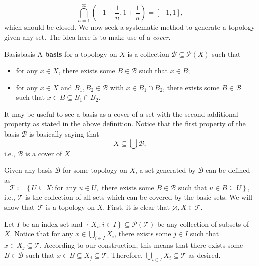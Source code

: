 \documentclass[math]{amznotes}
\theoremstyle{remark}
\begin{document}
\begin{equation*}
    \bigcap_{n = 1}^{\infty}\left(-1 - \frac{1}{n}, 1 + \frac{1}{n}\right) = [-1, 1],
\end{equation*}
which should be closed. We now seek a systematic method to generate a topology given any set. The idea here is to make use of a \textit{cover}.
\begin{dfnbox}{Basis}{basis}
    A {\color{red} \textbf{basis}} for a topology on $X$ is a collection $\mathcal{B} \subseteq \mathcal{P}\left(X\right)$ such that 
    \begin{itemize}
        \item for any $x \in X$, there exists some $B \in \mathcal{B}$ such that $x \in B$;
        \item for any $x \in X$ and $B_1, B_2 \in \mathcal{B}$ with $x \in B_1 \cap B_2$, there exists some $B \in \mathcal{B}$ such that $x \in B \subseteq B_1 \cap B_2$.
    \end{itemize}
\end{dfnbox}
It may be useful to see a basis as a cover of a set with the second additional property as stated in the above definition. Notice that the first property of the basis $\mathcal{B}$ is basically saying that 
\begin{equation*}
    X \subseteq \bigcup \mathcal{B},
\end{equation*}
i.e., $\mathcal{B}$ is a cover of $X$.

Given any basis $\mathcal{B}$ for some topology on $X$, a set generated by $\mathcal{B}$ can be defined as 
\begin{equation*}
    \mathcal{T} \coloneqq \left\{U \subseteq X \colon \textrm{for any } u \in U, \textrm{ there exists some } B \in \mathcal{B} \textrm{ such that } u \in B \subseteq U\right\},
\end{equation*}
i.e., $\mathcal{T}$ is the collection of all sets which can be covered by the basic sets. We will show that~$\mathcal{T}$ is a topology on $X$. First, it is clear that $\varnothing, X \in \mathcal{T}$. 

Let $I$ be an index set and $\left\{X_i \colon i \in I\right\}\subseteq \mathcal{P}\left(\mathcal{T}\right)$ be any collection of subsets of $X$. Notice that for any $x \in \bigcup_{i \in I}X_i$, there exists some $j \in I$ such that $x \in X_j \subseteq \mathcal{T}$. According to our construction, this means that there exists some $B \in \mathcal{B}$ such that $x \in B \subseteq X_j \subseteq \mathcal{T}$. Therefore, $\bigcup_{i \in I}X_i \subseteq \mathcal{T}$ as desired.
\end{document}
